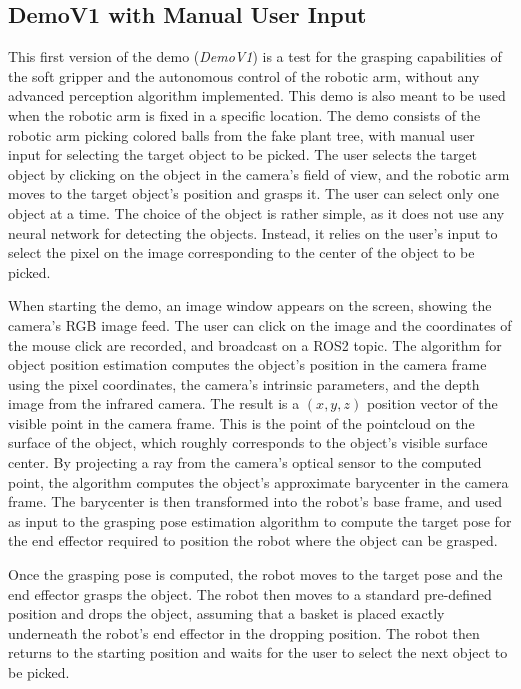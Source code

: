 \subsection{DemoV1 with Manual User Input}

This first version of the demo (\textit{DemoV1}) is a test for the grasping capabilities of the soft gripper and
the autonomous control of the robotic arm, without any advanced perception algorithm implemented. 
This demo is also meant to be used when the robotic arm is fixed in a specific location. The demo consists of
the robotic arm picking colored balls from the fake plant tree, with manual user input for selecting the target
object to be picked. The user selects the target object by clicking on the object in the camera's field of view,
and the robotic arm moves to the target object's position and grasps it. The user can select only one object at 
a time. The choice of the object is rather simple, as it does not use any neural network for detecting
the objects. Instead, it relies on the user's input to select the pixel on the image corresponding
to the center of the object to be picked.

When starting the demo, an image window appears on the screen, showing the camera's RGB image feed.
The user can click on the image and the coordinates of the mouse click are recorded, and broadcast on a ROS2
topic. The algorithm for object position estimation computes the object's position in the camera frame
using the pixel coordinates, the camera's intrinsic parameters, and the depth image from the infrared camera.
The result is a $(x, y, z)$ position vector of the visible point in the camera frame. 
This is the point of the pointcloud on the surface of the object, which roughly corresponds to the 
object's visible surface center. By projecting a ray from the camera's optical sensor to the computed point,
the algorithm computes the object's approximate barycenter in the camera frame. The barycenter is then transformed
into the robot's base frame, and used as input to the grasping pose estimation algorithm to compute the target pose
for the end effector required to position the robot where the object can be grasped.

Once the grasping pose is computed, the robot moves to the target pose and the end effector grasps the object.
The robot then moves to a standard pre-defined position and drops the object, assuming that a basket
is placed exactly underneath the robot's end effector in the dropping position. The robot then returns to the
starting position and waits for the user to select the next object to be picked.

